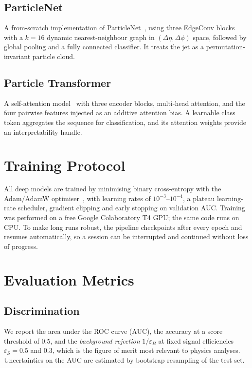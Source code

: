 \subsection{ParticleNet}
A from-scratch implementation of
ParticleNet~\citep{qu2020particlenet}, using three EdgeConv
blocks~\citep{wang2019dgcnn} with a $k=16$ dynamic nearest-neighbour graph
in $(\Delta\eta,\Delta\phi)$ space, followed by global pooling and a fully
connected classifier. It treats the jet as a permutation-invariant particle
cloud.

\subsection{Particle Transformer}
A self-attention model~\citep{qu2022particletransformer} with three encoder
blocks, multi-head attention, and the four pairwise features injected as an
additive attention bias. A learnable class token aggregates the sequence for
classification, and its attention weights provide an interpretability handle.

\section{Training Protocol}
\label{sec:training}

All deep models are trained by minimising binary cross-entropy with the
Adam/AdamW optimiser~\citep{kingma2014adam,loshchilov2019adamw}, with learning
rates of $10^{-3}$--$10^{-4}$, a plateau learning-rate scheduler, gradient
clipping and early stopping on validation AUC. Training was performed on a
free Google Colaboratory T4 GPU; the same code runs on CPU. To make long runs
robust, the pipeline checkpoints after every epoch and resumes automatically,
so a session can be interrupted and continued without loss of progress.

\section{Evaluation Metrics}
\label{sec:metrics}

\subsection{Discrimination}
We report the area under the ROC curve (AUC), the accuracy at a score
threshold of $0.5$, and the \emph{background rejection}
$1/\varepsilon_B$ at fixed signal efficiencies $\varepsilon_S=0.5$ and
$0.3$, which is the figure of merit most relevant to physics analyses.
Uncertainties on the AUC are estimated by bootstrap resampling of the test
set.

